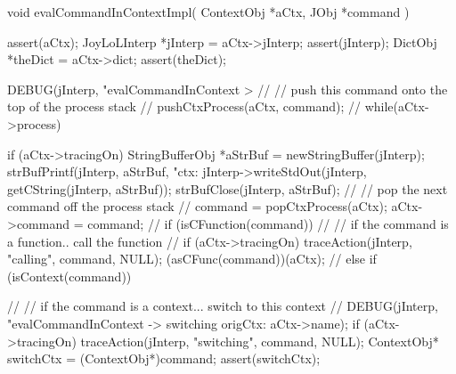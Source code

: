 \startCCode
void evalCommandInContextImpl(
  ContextObj *aCtx,
  JObj   *command
) {
  assert(aCtx);
  JoyLoLInterp *jInterp = aCtx->jInterp;
  assert(jInterp);
  DictObj *theDict = aCtx->dict;
  assert(theDict);

  DEBUG(jInterp, "evalCommandInContext > %
  //
  // push this command onto the top of the process stack
  //
  pushCtxProcess(aCtx, command);
  //
  while(aCtx->process) {
    if (aCtx->tracingOn) {
      StringBufferObj *aStrBuf = 
        newStringBuffer(jInterp);
      strBufPrintf(jInterp, aStrBuf, "\n ctx: %
      jInterp->writeStdOut(jInterp, getCString(jInterp, aStrBuf));
      strBufClose(jInterp, aStrBuf);
    }
    //
    // pop the next command off the process stack
    //
    command = popCtxProcess(aCtx);
    aCtx->command = command;
    //
    if (isCFunction(command)) {
      //
      // if the command is a function.. call the function
      //
      if (aCtx->tracingOn) 
        traceAction(jInterp, "calling", command, NULL);
      (asCFunc(command))(aCtx);
      //
    } else if (isContext(command)) {
      //
      // if the command is a context... switch to this context
      //
      DEBUG(jInterp, "evalCommandInContext -> switching origCtx: %
            aCtx->name);
      if (aCtx->tracingOn)
        traceAction(jInterp, "switching", command, NULL);
      ContextObj* switchCtx = (ContextObj*)command;
      assert(switchCtx);

}}}
